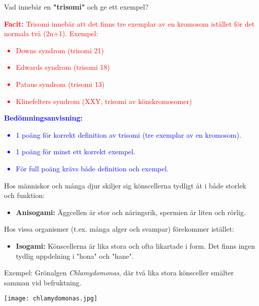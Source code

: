 \documentclass{exam}
\newcommand{\facit}[1]{\textcolor{red}{\textbf{Facit:} #1}}
\newcommand{\bedomning}[1]{\textcolor{blue}{\textbf{Bedömningsanvisning:} #1}}
\begin{document}
\begin{questions}
\question Vad innebär en \textbf{"trisomi"} och ge ett exempel?
\vspace{5mm}

\facit{
Trisomi innebär att det finns tre exemplar av en kromosom istället för det normala två (2n+1). Exempel:
\begin{itemize}
  \item Downs syndrom (trisomi 21)
  \item Edwards syndrom (trisomi 18)
  \item Pataus syndrom (trisomi 13)
  \item Klinefelters syndrom (XXY, trisomi av könskromosomer)
\end{itemize}
}

\bedomning{
\begin{itemize}
  \item 1 poäng för korrekt definition av trisomi (tre exemplar av en kromosom).
  \item 1 poäng för minst ett korrekt exempel.
  \item För full poäng krävs både definition och exempel.
\end{itemize}
}

\break

\vspace{5mm} %
\begin{center}
\end{center}

\question
Hos människor och många djur skiljer sig könscellerna tydligt åt i både storlek och funktion:
\begin{itemize}
  \item \textbf{Anisogami:} Äggcellen är stor och näringsrik, spermien är liten och rörlig.
\end{itemize}

Hos vissa organismer (t.ex. många alger och svampar) förekommer istället:
\begin{itemize}
  \item \textbf{Isogami:} Könscellerna är lika stora och ofta likartade i form. Det finns ingen tydlig uppdelning i "hona" och "hane".
\end{itemize}

Exempel: Grönalgen \textit{Chlamydomonas}, där två lika stora könsceller smälter samman vid befruktning.

\begin{center}
    \texttt{[image: chlamydomonas.jpg]}
    

\end{center}
\end{questions}
\end{document}
